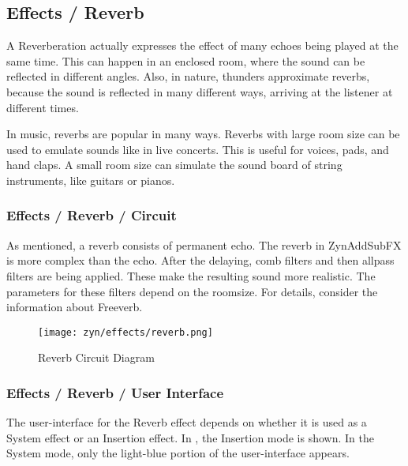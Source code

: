 

\subsection{Effects / Reverb}
\label{subsec:effects_edit_reverb}

   A Reverberation actually expresses the effect of many echoes being played
   at the same time. This can happen in an enclosed room, where the sound can
   be reflected in different angles. Also, in nature, thunders approximate
   reverbs, because the sound is reflected in many different ways, arriving
   at the listener at different times.

   In music, reverbs are popular in many ways. Reverbs with large room size
   can be used to emulate sounds like in live concerts. This is useful for
   voices, pads, and hand claps. A small room size can simulate the sound
   board of string instruments, like guitars or pianos.

\subsubsection{Effects / Reverb / Circuit}
\label{subsubsec:effects_edit_reverb_circuit}

   As mentioned, a reverb consists of permanent echo. The reverb in
   ZynAddSubFX is more complex than the echo. After the delaying, comb
   filters and then allpass filters are being applied. These make the
   resulting sound more realistic. The parameters for these filters depend on
   the roomsize. For details, consider the information about Freeverb.

\begin{figure}[H]
   \centering 
   \texttt{[image: zyn/effects/reverb.png]}
   \caption{Reverb Circuit Diagram}
   \label{fig:reverb_circuit_diagram}
\end{figure}

\subsubsection{Effects / Reverb / User Interface}
\label{subsubsec:effects_edit_reverb_ui}

   The user-interface for the Reverb effect depends on whether it is used as a
   System effect or an Insertion effect.
   In ,
   the Insertion mode is shown.  In the System mode, only the light-blue
   portion of the user-interface appears.

